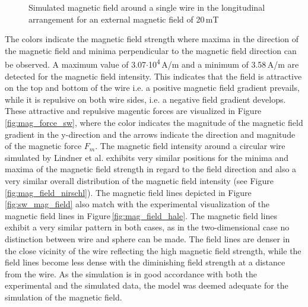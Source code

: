 \begin{figure}[H]
        \caption[Simulated magnetic field around a single wire]{Simulated magnetic field around a single wire in the longitudinal arrangement for an external magnetic field of 20\,mT}
        \label{fig:sw_fm_mag_field}
  \end{figure}

% 

The colors indicate the magnetic field strength where maxima in the direction of the magnetic field and minima perpendicular to the magnetic field direction can be observed. A maximum value of 3.07$\cdotp$10\textsuperscript{4}\,A/m and a minimum of 3.58\,A/m are detected for the magnetic field intensity. This indicates that the field is attractive on the top and bottom of the wire i.e. a positive magnetic field gradient prevails, while it is repulsive on both wire sides, i.e. a negative field gradient develops. These attractive and repulsive magentic forces are visualized in Figure\,\ref{fig:mag_force_sw}, where the color indicates the magnitude of the magnetic field gradient in the y-direction and the arrows indicate the direction and magnitude of the magnetic force $F_{m}$. The magnetic field intensity around a circular wire simulated by Lindner et al. \cite{lindner2013simulation} exhibits very similar positions for the minima and maxima of the magnetic field strength in regard to the field direction and also a very similar overall distribution of the magnetic field intensity (see Figure\,\ref{fig:mag_field_nirschl}). The magnetic field lines depicted in Figure\,\ref{fig:sw_mag_field} also match with the experimental visualization of the magnetic field lines in Figure\,\ref{fig:mag_field_hale}. The magnetic field lines exhibit a very similar pattern in both cases, as in the two-dimensional case no distinction between wire and sphere can be made. The field lines are denser in the close vicinity of the wire reflecting the high magnetic field strength, while the field lines become less dense with the diminishing field strength at a distance from the wire. As the simulation is in good accordance with both the experimental and the simulated data, the model was deemed adequate for the simulation of the magnetic field.  

